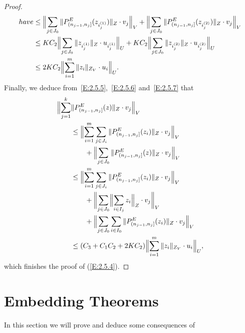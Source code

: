 \documentclass[11pt,leqno]{amsart}
\theoremstyle{definition}
\begin{document}
\begin{proof}
\begin{align}
{      have}
	&\le \Bigl\|\sum_{j\in J_0}
	    \|P^E_{(n_{j-1},n_j]} (z_{i^{(1)}_j}) \|_{Z}\cdot v_j\Bigr\|_V+ \Bigl\|\sum_{j\in J_0}
	      \|P^E_{(n_{j-1},n_j]} (z_{i^{(2)}_j}) \|_{Z}\cdot v_j\Bigr\|_V\notag\\
		&\le KC_2 \Bigl\|\sum_{j\in J_0}
		\|z_{i^{(1)}_j} \|_{Z}\cdot u_{i^{(1)}_j}  \Bigr\|_U+KC_2 \Bigl\|\sum_{j\in J_0}
		\|z_{i^{(2)}_j} \|_{Z}\cdot u_{i^{(2)}_j}  \Bigr\|_U\notag\\
		&\le 2KC_2 \Bigl\|\sum_{i=1}^m \|z_i \|_{Z_V}\cdot u_i\Bigr\|_U\notag.
    \end{align}
    Finally, we deduce from~\eqref{E:2.5.5},~\eqref{E:2.5.6}
    and~\eqref{E:2.5.7} that
    \begin{align*}
      \Bigl\|\sum_{j=1}^k&\|P^E_{(n_{j-1},n_j]}(z)\|_Z\cdot v_j\Bigr\|_V  \\
	&\le \Bigl\|\sum_{i=1}^m\sum_{j\in J_i} \|P^E_{(n_{j-1},n_j]}(z_i)\|_Z\cdot v_j\Bigr\|_V  \\
	  &\qquad+\Bigl\|\sum_{j\in J_0}\|P^E_{(n_{j-1},n_j]}(z)\|_Z\cdot v_j\Bigr\|_V  \\
	    &\le \Bigl\|\sum_{i=1}^m\sum_{j\in J_i} \|P^E_{(n_{j-1},n_j]}(z_i)\|_Z\cdot v_j\Bigr\|_V  \\
	      &\qquad+\biggl\|\sum_{j\in J_0}\Bigl\|
	      \sum_{i\in I_j} z_i\Bigr\|_Z\cdot v_j\biggr\|_V  \\
		&\qquad+\Bigl\|\sum_{j\in J_0}\sum_{i\in I_0}\|P^E_{(n_{j-1},n_j]}(z_i)\|_Z\cdot v_j\Bigr\|_V  \\
		  &\le(C_3+C_1C_2+2KC_2)\Bigl\|\sum_{i=1}^m \|z_i \|_{Z_V}\cdot u_i\Bigr\|_U,
    \end{align*}
    which finishes the proof of   (\ref{E:2.5.4}).
\end{proof}

\section{Embedding Theorems}\label{S:3}

In this section we will prove and deduce some consequences of
\end{document}
